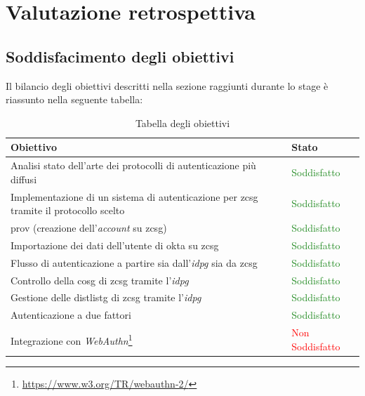 
\chapter{Valutazione retrospettiva}
\label{cap:retrospettiva}

\section{Soddisfacimento degli obiettivi}
Il bilancio degli obiettivi descritti nella sezione  raggiunti durante lo stage è riassunto nella seguente tabella:

\begin{center}
    \begin{table}[h]
    \def\arraystretch{2}
    \begin{tabular}{|p{9cm}|p{3cm}|} %
        \hline
        \textbf{Obiettivo} & \textbf{Stato} \\ \hline  
         Analisi stato dell’arte dei protocolli di autenticazione più diffusi & \textcolor{ForestGreen}{Soddisfatto}\\ \hline
         Implementazione di un sistema di autenticazione per \gls{zcsg} tramite il protocollo scelto & \textcolor{ForestGreen}{Soddisfatto}\\ \hline
         \gls{prov} (creazione dell'\textit{account} su \gls{zcsg})& \textcolor{ForestGreen}{Soddisfatto}\\ \hline
         Importazione dei dati dell’utente di \gls{okta} su \gls{zcsg} & \textcolor{ForestGreen}{Soddisfatto}\\ \hline
         Flusso di autenticazione a partire sia dall’\textit{\gls{idpg}} sia da \gls{zcsg} & \textcolor{ForestGreen}{Soddisfatto}\\ \hline
         Controllo della \gls{cosg} di \gls{zcsg} tramite l’\textit{\gls{idpg}} & \textcolor{ForestGreen}{Soddisfatto}\\ \hline
         Gestione delle \gls{distlistg} di \gls{zcsg} tramite l'\textit{\gls{idpg}} & \textcolor{ForestGreen}{Soddisfatto}\\ \hline
         Autenticazione a due fattori & \textcolor{ForestGreen}{Soddisfatto}\\ \hline
         Integrazione con \textit{WebAuthn}\footnote{\url{https://www.w3.org/TR/webauthn-2/}} & \textcolor{Red}{Non Soddisfatto}\\ \hline
    \end{tabular}
    \caption{Tabella degli obiettivi}
    \end{table}
\end{center}

